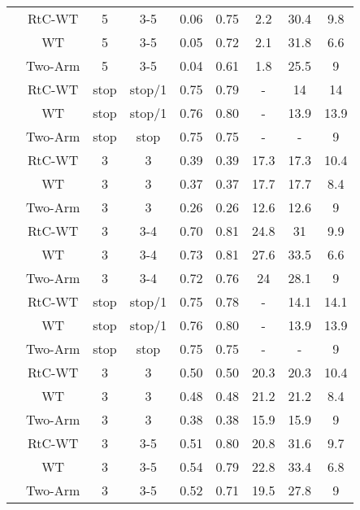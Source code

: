 \begin{longtable}[t]{ccccccccc}
	\endfoot
	\bottomrule
	\endlastfoot
	& RtC-WT & 5 & 3-5 & 0.06 & 0.75 & 2.2 & 30.4 & 9.8\\
	\nopagebreak
	& WT & 5 & 3-5 & 0.05 & 0.72 & 2.1 & 31.8 & 6.6\\
	\nopagebreak
	\multirow{-3}{*}{\centering\arraybackslash 1} & Two-Arm & 5 & 3-5 & 0.04 & 0.61 & 1.8 & 25.5 & 9\\
	\cmidrule{1-9}\pagebreak[0]
	& RtC-WT & stop & stop/1 & 0.75 & 0.79 & - & 14 & 14\\
	\nopagebreak
	& WT & stop & stop/1 & 0.76 & 0.80 & - & 13.9 & 13.9\\
	\nopagebreak
	\multirow{-3}{*}{\centering\arraybackslash 2} & Two-Arm & stop & stop & 0.75 & 0.75 & - & - & 9\\
	\cmidrule{1-9}\pagebreak[0]
	& RtC-WT & 3 & 3 & 0.39 & 0.39 & 17.3 & 17.3 & 10.4\\
	\nopagebreak
	& WT & 3 & 3 & 0.37 & 0.37 & 17.7 & 17.7 & 8.4\\
	\nopagebreak
	\multirow{-3}{*}{\centering\arraybackslash 3} & Two-Arm & 3 & 3 & 0.26 & 0.26 & 12.6 & 12.6 & 9\\
	\cmidrule{1-9}\pagebreak[0]
	& RtC-WT & 3 & 3-4 & 0.70 & 0.81 & 24.8 & 31 & 9.9\\
	\nopagebreak
	& WT & 3 & 3-4 & 0.73 & 0.81 & 27.6 & 33.5 & 6.6\\
	\nopagebreak
	\multirow{-3}{*}{\centering\arraybackslash 4} & Two-Arm & 3 & 3-4 & 0.72 & 0.76 & 24 & 28.1 & 9\\
	\cmidrule{1-9}\pagebreak[0]
	& RtC-WT & stop & stop/1 & 0.75 & 0.78 & - & 14.1 & 14.1\\
	\nopagebreak
	& WT & stop & stop/1 & 0.76 & 0.80 & - & 13.9 & 13.9\\
	\nopagebreak
	\multirow{-3}{*}{\centering\arraybackslash 5} & Two-Arm & stop & stop & 0.75 & 0.75 & - & - & 9\\
	\cmidrule{1-9}\pagebreak[0]
	& RtC-WT & 3 & 3 & 0.50 & 0.50 & 20.3 & 20.3 & 10.4\\
	\nopagebreak
	& WT & 3 & 3 & 0.48 & 0.48 & 21.2 & 21.2 & 8.4\\
	\nopagebreak
	\multirow{-3}{*}{\centering\arraybackslash 6} & Two-Arm & 3 & 3 & 0.38 & 0.38 & 15.9 & 15.9 & 9\\
	\cmidrule{1-9}\pagebreak[0]
	& RtC-WT & 3 & 3-5 & 0.51 & 0.80 & 20.8 & 31.6 & 9.7\\
	\nopagebreak
	& WT & 3 & 3-5 & 0.54 & 0.79 & 22.8 & 33.4 & 6.8\\
	\nopagebreak
	\multirow{-3}{*}{\centering\arraybackslash 7} & Two-Arm & 3 & 3-5 & 0.52 & 0.71 & 19.5 & 27.8 & 9\\

\end{longtable}
